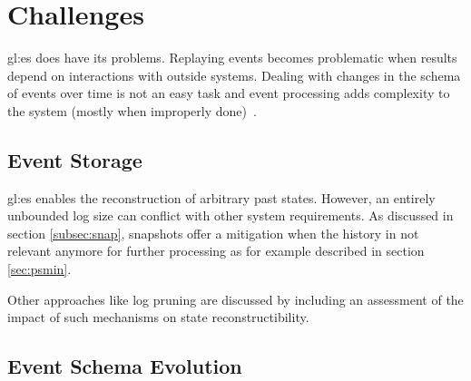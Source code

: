 
\section{Challenges}

\gls{gl:es} does have its problems. Replaying events becomes problematic when results depend on interactions with outside systems. Dealing with changes in the schema of events over time is not an easy task and event processing adds complexity to the system (mostly when improperly done)~\citep{esvsed}.

\subsection{Event Storage}

\gls{gl:es} enables the reconstruction of arbitrary past states. However, an entirely unbounded log size can conflict with other system requirements. As discussed in section \ref{subsec:snap}, snapshots offer a mitigation when the history in not relevant anymore for further processing as for example described in section \ref{sec:psmin}.

Other approaches like log pruning are discussed by \citep{10.1145/3210284.3219767} including an assessment of the impact of such mechanisms on state reconstructibility.


\subsection{Event Schema Evolution}


